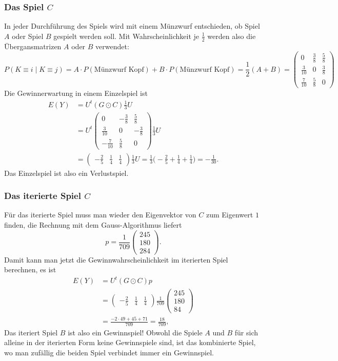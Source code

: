 \subsubsection{Das Spiel $C$}
In jeder Durchführung des Spiels wird mit einem Münzwurf entschieden,
ob Spiel $A$ oder Spiel $B$ gespielt werden soll.
Mit Wahrscheinlichkeit je $\frac12$ werden also die Übergansmatrizen
$A$ oder $B$ verwendet:
\[
P(K\equiv i\mid K\equiv j)
=
A\cdot P(\text{Münzwurf Kopf})
+
B\cdot P(\text{Münzwurf Kopf})
=
\frac12(A+B)
=
\begin{pmatrix}
0            & \frac{3}{8} & \frac{5}{8} \\
\frac{3}{10} & 0           & \frac{3}{8} \\
\frac{7}{10} & \frac{5}{8} & 0
\end{pmatrix}
\]
Die Gewinnerwartung in einem Einzelspiel ist
\begin{align*}
E(Y)
&=
U^t
(G\odot C)
\frac13U
\\
&=
U^t
\begin{pmatrix}
 0            &-\frac{3}{8} & \frac{5}{8} \\
 \frac{3}{10} & 0           &-\frac{3}{8} \\
-\frac{7}{10} & \frac{5}{8} & 0
\end{pmatrix}
\frac13U
\\
&=
\begin{pmatrix}
-\frac{2}{5} & \frac{1}{4} & \frac{1}{4}
\end{pmatrix}
\frac13U
=
\frac13\biggl(-\frac{2}{5}+\frac{1}{4}+\frac{1}{4}\biggr)
=
-\frac{1}{30}.
\end{align*}
Das Einzelspiel ist also ein Verlustspiel.

\subsubsection{Das iterierte Spiel $C$}
Für das iterierte Spiel muss man wieder den Eigenvektor von $C$ zum
Eigenwert $1$ finden, die Rechnung mit dem Gauss-Algorithmus liefert
\[
p=
\frac{1}{709}
\begin{pmatrix}
245\\180\\284
\end{pmatrix}.
\]
Damit kann man jetzt die Gewinnwahrscheinlichkeit im iterierten Spiel
berechnen, es ist
\begin{align*}
E(Y)
&=
U^t
(G\odot C) p
\\
&=
\begin{pmatrix}
-\frac{2}{5} & \frac{1}{4} & \frac{1}{4}
\end{pmatrix}
\frac{1}{709}
\begin{pmatrix}
245\\180\\84
\end{pmatrix}
\\
&=
\frac{
-2\cdot 49 + 45 + 71
}{709}
=
\frac{18}{709},
\end{align*}
Das iteriert Spiel $B$ ist also ein Gewinnspiel!
Obwohl die Spiele $A$ und $B$ für sich alleine in der iterierten Form
keine Gewinnspiele sind, ist das kombinierte Spiel, wo man zufällig
die beiden Spiel verbindet immer ein Gewinnspiel.

